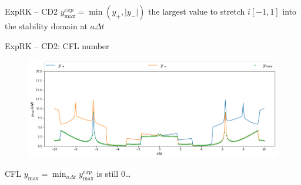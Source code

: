 \documentclass{beamer}
\begin{document}
\begin{frame}{ExpRK -- CD2}
  $y^{exp}_\text{max} = \min(y_+,|y_-|)$ the largest value to stretch $i[-1,1]$ into the stability domain at $a\Delta t$
\end{frame}
\begin{frame}{ExpRK -- CD2: CFL number}
  \begin{figure}\centering
    \includegraphics[width=\textwidth]{img/ymax_CM.png}
  \end{figure}
  CFL $y_\text{max} = \min_{a\Delta t}y^{exp}_\text{max}$ is still 0\dots
\end{frame}
\end{document}
